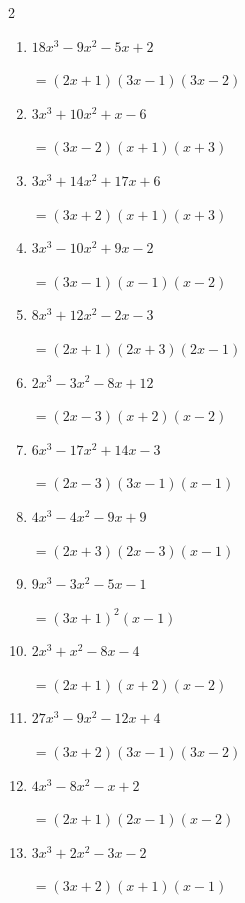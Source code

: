 \begin{multicols}{2}
\begin{enumerate}
  \item $18x^{3}-9x^{2}-5x+2$

        $=(2x+1)(3x-1)(3x-2)$

  \item $3x^{3}+10x^{2}+x-6$

        $=(3x-2)(x+1)(x+3)$

  \item $3x^{3}+14x^{2}+17x+6$

        $=(3x+2)(x+1)(x+3)$

\columnbreak %

\resetques

  \item $3x^{3}-10x^{2}+9x-2$

        $=(3x-1)(x-1)(x-2)$

  \item $8x^{3}+12x^{2}-2x-3$

        $=(2x+1)(2x+3)(2x-1)$

  \item $2x^{3}-3x^{2}-8x+12$

        $=(2x-3)(x+2)(x-2)$

  \item $6x^{3}-17x^{2}+14x-3$

        $=(2x-3)(3x-1)(x-1)$

  \item $4x^{3}-4x^{2}-9x+9$

        $=(2x+3)(2x-3)(x-1)$

\columnbreak %

  \item $9x^{3}-3x^{2}-5x-1$

        $=(3x+1) ^{ 2 }(x-1)$

  \item $2x^{3}+x^{2}-8x-4$

        $=(2x+1)(x+2)(x-2)$

  \item $27x^{3}-9x^{2}-12x+4$

        $=(3x+2)(3x-1)(3x-2)$

  \item $4x^{3}-8x^{2}-x+2$

        $=(2x+1)(2x-1)(x-2)$

  \item $3x^{3}+2x^{2}-3x-2$

        $=(3x+2)(x+1)(x-1)$

\columnbreak %

\resetques


\end{enumerate}
\end{multicols}
